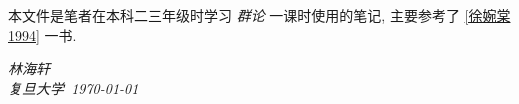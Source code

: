     本文件是笔者在本科二三年级时学习 \emph{群论} 一课时使用的笔记, 主要参考了 \ref{徐婉棠1994} 一书.

    \vspace{2cm}
    \begin{flushright}
        \textit{林海轩} \\[1em]
        \textit{复旦大学\ \today}
    \end{flushright}